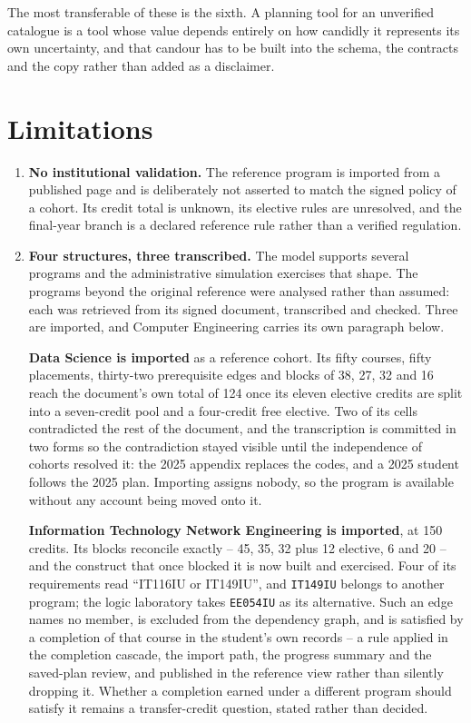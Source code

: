 The most transferable of these is the sixth. A planning tool for an unverified catalogue is a tool
whose value depends entirely on how candidly it represents its own uncertainty, and that candour has
to be built into the schema, the contracts and the copy rather than added as a disclaimer.

\section{Limitations}

\begin{enumerate}
  \item \textbf{No institutional validation.} The reference program is imported from a published
        page and is deliberately not asserted to match the signed policy of a cohort. Its credit
        total is unknown, its elective rules are unresolved, and the final-year branch is a declared
        reference rule rather than a verified regulation.
  \item \textbf{Four structures, three transcribed.} The model supports several programs and
        the administrative simulation exercises that shape. The programs beyond the original reference
        were analysed rather than assumed: each was retrieved from its signed document, transcribed
        and checked. Three are imported, and Computer Engineering carries its own paragraph below.

        \textbf{Data Science is imported} as a reference cohort. Its fifty courses, fifty
        placements, thirty-two prerequisite edges and blocks of 38, 27, 32 and 16 reach the
        document's own total of 124 once its eleven elective credits are split into a seven-credit
        pool and a four-credit free elective. Two of its cells contradicted the rest of the document,
        and the transcription is committed in two forms so the contradiction stayed visible until the
        independence of cohorts resolved it: the 2025 appendix replaces the codes, and a 2025 student
        follows the 2025 plan. Importing assigns nobody, so the program is available without any
        account being moved onto it.

        \textbf{Information Technology Network Engineering is imported}, at 150 credits. Its blocks
        reconcile exactly -- 45, 35, 32 plus 12 elective, 6 and 20 -- and the construct that once
        blocked it is now built and exercised. Four of its requirements read ``IT116IU or
        IT149IU'', and \texttt{IT149IU} belongs to another program; the logic laboratory takes
        \texttt{EE054IU} as its alternative. Such an edge names no member, is excluded from the
        dependency graph, and is satisfied by a completion of that course in the student's own
        records -- a rule applied in the completion cascade, the import path, the progress summary
        and the saved-plan review, and published in the reference view rather than silently
        dropping it. Whether a completion earned under a different program should satisfy it remains
        a transfer-credit question, stated rather than decided.


\end{enumerate}
